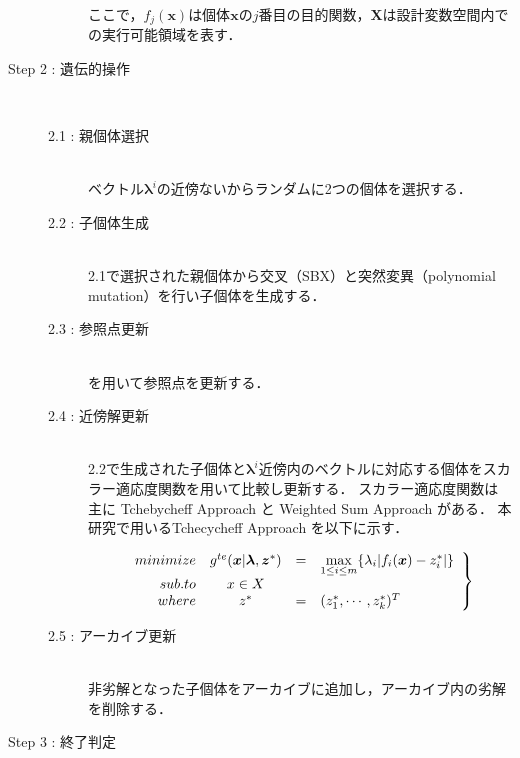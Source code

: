 \documentclass[../main/main]{subfiles}
\begin{document}
\begin{description}
\begin{description}
	ここで，$f_j (\bm x)$は個体$\bm x$の$j$番目の目的関数，$\bm X$は設計変数空間内での実行可能領域を表す．
	
	\vspace{-0.1in}

	\end{description}
\item[Step 2 : 遺伝的操作]\mbox{}\\
\vspace{-0.5in}
	\begin{description}
	\item[2.1 : 親個体選択]\mbox{}\\
	ベクトル$\bm \lambda^i$の近傍ないからランダムに2つの個体を選択する．
	
	\item[2.2 : 子個体生成]\mbox{}\\
	2.1で選択された親個体から交叉（SBX）と突然変異（polynomial mutation）を行い子個体を生成する．
	
	\item[2.3 : 参照点更新]\mbox{}\\
	を用いて参照点を更新する．
	
	\item[2.4 : 近傍解更新]\mbox{}\\
	2.2で生成された子個体と$\bm \lambda^i$近傍内のベクトルに対応する個体をスカラー適応度関数を用いて比較し更新する．
	スカラー適応度関数は主に Tchebycheff Approach と Weighted Sum Approach がある．
	本研究で用いるTchecycheff Approach を以下に示す．
	
	\begin{eqnarray}
	\left.
	\begin{array}{rccl}
	minimize & g^{te} (\bm x|\bm \lambda , \bm z^*)& =& \mathop{\rm max}\limits_{1 \leq i \leq m} \{ \lambda_i|f_i (\bm x) - z^*_i| \}\\
	sub.to & x \in X &  &  \\
	where & z^* & = & (z_1^*, \cdots, z^*_k)^T
	\end{array}
	\right\}
	\label{sansyou}
	\end{eqnarray}
	
	
	
	\item[2.5 : アーカイブ更新]\mbox{}\\
	非劣解となった子個体をアーカイブに追加し，アーカイブ内の劣解を削除する．
	\vspace{-0.1in}
	
	\end{description}
\item[Step 3 : 終了判定]\mbox{}\\

\end{description}
\end{document}
